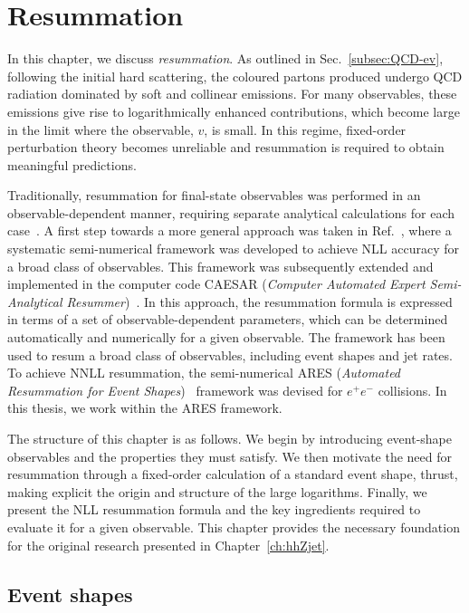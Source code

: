 \chapter{Resummation}
\label{ch:resum}

In this chapter, we discuss \emph{resummation}. As 
outlined in Sec.~\ref{subsec:QCD-ev}, following the initial hard 
scattering, the coloured partons produced undergo QCD radiation dominated 
by soft and collinear emissions. For many observables, these emissions 
give rise to logarithmically enhanced contributions, which become large in 
the limit where the observable, $v$, is small. In this regime, fixed-order 
perturbation theory becomes unreliable and resummation is required to obtain meaningful predictions. 

Traditionally, resummation for final-state observables was performed in an
observable-dependent manner, requiring separate analytical calculations for
each case~\cite{Collins:1984kg, Catani:1992ua, Bonciani:2003nt}. A first
step towards a more general approach was taken in Ref.~\cite{Banfi:2001bz},
where a systematic semi-numerical framework was developed to achieve NLL
accuracy for a broad class of observables. This framework was subsequently
extended and implemented in the computer code \textsc{CAESAR}
(\emph{Computer Automated Expert Semi-Analytical Resummer})~\cite{Banfi:2004yd}.
In this approach, the resummation formula is expressed in terms of a set of
observable-dependent parameters, which can be determined automatically and
numerically for a given observable. The framework has been used to resum a
broad class of observables, including event shapes and jet rates. 
To achieve NNLL resummation, the semi-numerical \textsc{ARES}
(\emph{Automated Resummation for Event Shapes})~\cite{Banfi:2014sua,
Banfi:2016zlc, Banfi:2018mcq, Arpino:2019ozn} framework was devised
for $e^+e^-$ collisions.
In this thesis, we
work within the \textsc{ARES} framework.

The structure of this chapter is as follows. We begin by introducing event-shape
observables and the properties they must satisfy. We then motivate the need
for resummation through a fixed-order calculation of a standard event shape,
thrust, making explicit the origin and structure of the large logarithms.
Finally, we present the NLL resummation formula and the key ingredients
required to evaluate it for a given observable. This chapter provides the
necessary foundation for the original research presented in
Chapter~\ref{ch:hhZjet}.

\section{Event shapes}
\label{sec:event-shapes}

